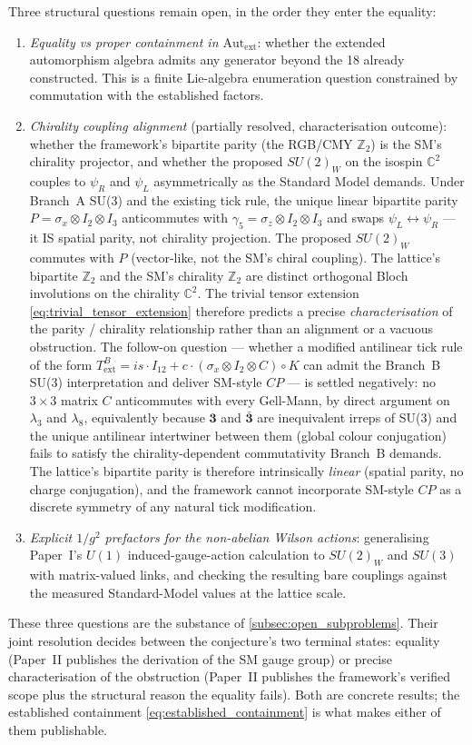 Three structural questions
remain open, in the order they enter the equality:
\begin{enumerate}
\item \emph{Equality vs proper containment in
$\mathrm{Aut}_\text{ext}$}: whether the extended automorphism
algebra admits any generator beyond the 18 already constructed.
This is a finite Lie-algebra enumeration question constrained by
commutation with the established factors.

\item \emph{Chirality coupling alignment} (partially resolved,
characterisation outcome): whether the framework's bipartite parity
(the RGB/CMY $\mathbb{Z}_2$) is the SM's chirality projector, and
whether the proposed $SU(2)_W$ on the isospin $\mathbb{C}^2$
couples to $\psi_R$ and $\psi_L$ asymmetrically as the Standard
Model demands.  Under Branch~A SU(3) and the existing tick rule,
the unique linear bipartite parity $P = \sigma_x \otimes I_2 \otimes
I_3$ anticommutes with $\gamma_5 = \sigma_z \otimes I_2 \otimes I_3$
and swaps $\psi_L \leftrightarrow \psi_R$ --- it IS spatial parity,
not chirality projection.  The proposed $SU(2)_W$ commutes with $P$
(vector-like, not the SM's chiral coupling).  The lattice's
bipartite $\mathbb{Z}_2$ and the SM's chirality $\mathbb{Z}_2$ are
distinct orthogonal Bloch involutions on the chirality
$\mathbb{C}^2$.  The trivial tensor extension
\eqref{eq:trivial_tensor_extension} therefore predicts a precise
\emph{characterisation} of the parity / chirality relationship
rather than an alignment or a vacuous obstruction.  The follow-on
question --- whether a modified antilinear tick rule of the form
$T_\text{ext}^B = is \cdot I_{12} + c \cdot (\sigma_x \otimes I_2
\otimes C) \circ K$ can admit the Branch~B SU(3) interpretation and
deliver SM-style $CP$ --- is settled negatively: no $3 \times 3$
matrix $C$ anticommutes with every Gell-Mann, by direct argument on
$\lambda_3$ and $\lambda_8$, equivalently because $\mathbf{3}$ and
$\bar{\mathbf{3}}$ are inequivalent irreps of SU(3) and the unique
antilinear intertwiner between them (global colour conjugation)
fails to satisfy the chirality-dependent commutativity Branch~B
demands.  The lattice's bipartite parity is therefore intrinsically
\emph{linear} (spatial parity, no charge conjugation), and the
framework cannot incorporate SM-style $CP$ as a discrete symmetry
of any natural tick modification.

\item \emph{Explicit $1/g^2$ prefactors for the non-abelian Wilson
actions}: generalising Paper~I's $U(1)$ induced-gauge-action
calculation to $SU(2)_W$ and $SU(3)$ with matrix-valued links, and
checking the resulting bare couplings against the measured
Standard-Model values at the lattice scale.
\end{enumerate}
These three questions are the substance of
\autoref{subsec:open_subproblems}.  Their joint resolution decides
between the conjecture's two terminal states: equality (Paper~II
publishes the derivation of the SM gauge group) or precise
characterisation of the obstruction (Paper~II publishes the
framework's verified scope plus the structural reason the equality
fails).  Both are concrete results; the established containment
\eqref{eq:established_containment} is what makes either of them
publishable.
